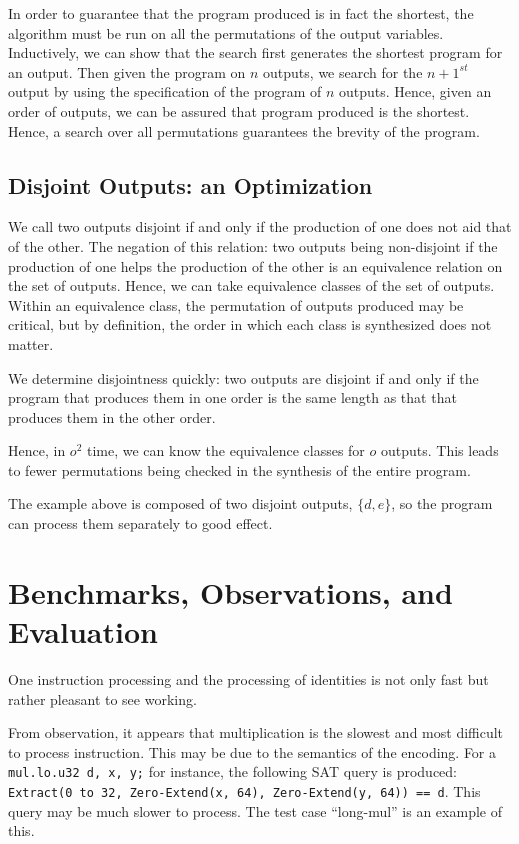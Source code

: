 \documentclass[letterpaper,twocolumn,10pt]{article}
\begin{document}
In order to guarantee that the program produced is in fact the shortest,
the algorithm must be run on all the permutations of the output variables.
Inductively, we can show that the search first generates the shortest
program for an output. Then given the program on $n$ outputs, we search
for the $n + 1^{st}$ output by using the specification of the program of
$n$ outputs. Hence, given an order of outputs, we can be assured that program
produced is the shortest. Hence, a search over all permutations guarantees the
brevity of the program.

\subsection{Disjoint Outputs: an Optimization}

We call two outputs disjoint if and only if the production of
one does not aid that of the other. The negation of this relation:
two outputs being non-disjoint if the production of one helps the
production of the other is an equivalence relation on the set of outputs.
Hence, we can take equivalence classes of the set of outputs.
Within an equivalence class, the permutation of outputs produced may be
critical, but by definition, the order in which each class is synthesized
does not matter.

We determine disjointness quickly: two outputs are disjoint if and only if
the program that produces them in one order is the same length as that that
produces them in the other order.

Hence, in $o^2$ time, we can know the equivalence classes for $o$ outputs.
This leads to fewer permutations being checked in the synthesis of the entire
program.

The example above is composed of two disjoint outputs, $\{d, e\}$, so the program
can process them separately to good effect.

\section{Benchmarks, Observations, and Evaluation}

One instruction processing and the processing of identities is not only fast
but rather pleasant to see working.

From observation, it appears that multiplication is the slowest and most
difficult to process instruction. This may be due to the semantics of the
encoding. For a \texttt{mul.lo.u32 d, x, y;} for instance, the following SAT query
is produced: \texttt{Extract(0 to 32, Zero-Extend(x, 64), Zero-Extend(y, 64)) == d}.
This query may be much slower to process. The test case ``long-mul'' is an example
of this.
\end{document}
